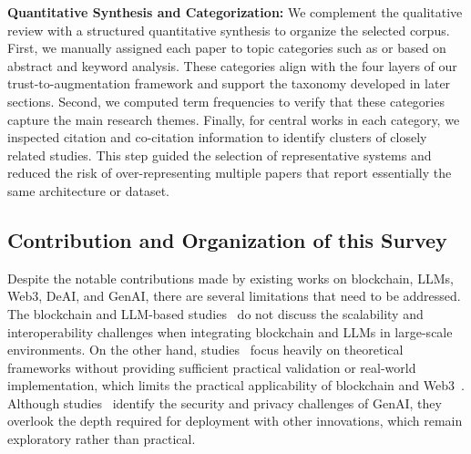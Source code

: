 \documentclass[5p,twocolumn]{elsarticle}
\begin{document}
\textbf{Quantitative Synthesis and Categorization:}
We complement the qualitative review with a structured quantitative synthesis to organize the selected corpus. First, we manually assigned each paper to topic categories such as  or  based on abstract and keyword analysis. These categories align with the four layers of our trust-to-augmentation framework and support the taxonomy developed in later sections. Second, we computed term frequencies to verify that these categories capture the main research themes. Finally, for central works in each category, we inspected citation and co-citation information to identify clusters of closely related studies. This step guided the selection of representative systems and reduced the risk of over-representing multiple papers that report essentially the same architecture or dataset.




\subsection{Contribution and Organization of this Survey}
Despite the notable contributions made by existing works on blockchain, LLMs, Web3, DeAI, and GenAI, there are several limitations that need to be addressed. The blockchain and LLM-based studies~\cite{he2024large,geren2025blockchain,luo2024bc4llm} do not discuss the scalability and interoperability challenges when integrating blockchain and LLMs in large-scale environments. On the other hand, studies~\cite{cao2022decentralized,kersic2024review,li2024blockchain,ressi2024ai,saleh2024blockchain,shen2024artificial,zhu2024survey} focus heavily on theoretical frameworks without providing sufficient practical validation or real-world implementation, which limits the practical applicability of blockchain and Web3~\cite{hui2025decentralization}. Although studies~\cite{friha2024llm,golda2024privacy,kheddar2024transformers,hagos2024recent} identify the security and privacy challenges of GenAI, they overlook the depth required for deployment with other innovations, which remain exploratory rather than practical. 
\end{document}

